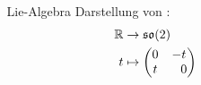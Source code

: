 \begin{frame}[t]
\begin{columns}[t,onlytextwidth]
\begin{column}{0.48\textwidth}
\end{column}
\begin{column}{0.48\textwidth}
  \begin{block}{Lie-Algebra}
    Darstellung von :
    \begin{align*}
      \mathbb R 
      &\to 
      \aso2
      \\
      t
      &\mapsto
      \begin{pmatrix}
        0 &         -t \\ 
        t & \phantom-0
      \end{pmatrix}
    \end{align*}
  \end{block}
\end{column}
\end{columns}
\end{frame}


